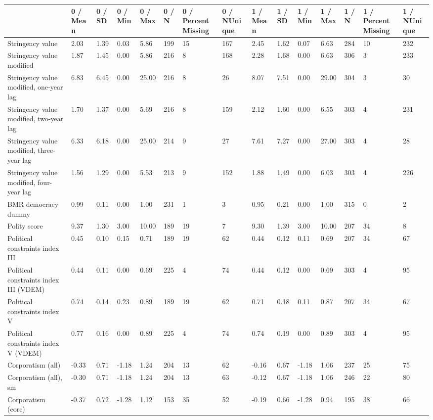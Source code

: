 
\begin{longtable}{lllllllllllllll}
\toprule
  & 0 / Mean & 0 / SD & 0 / Min & 0 / Max & 0 / N & 0 / PercentMissing & 0 / NUnique & 1 / Mean & 1 / SD & 1 / Min & 1 / Max & 1 / N & 1 / PercentMissing & 1 / NUnique\\
\midrule
Stringency value & 2.03 & 1.39 & 0.03 & 5.86 & 199 & 15 & 167 & 2.45 & 1.62 & 0.07 & 6.63 & 284 & 10 & 232\\
Stringency value modified & 1.87 & 1.45 & 0.00 & 5.86 & 216 & 8 & 168 & 2.28 & 1.68 & 0.00 & 6.63 & 306 & 3 & 233\\
Stringency value modified, one-year lag & 6.83 & 6.45 & 0.00 & 25.00 & 216 & 8 & 26 & 8.07 & 7.51 & 0.00 & 29.00 & 304 & 3 & 30\\
Stringency value modified, two-year lag & 1.70 & 1.37 & 0.00 & 5.69 & 216 & 8 & 159 & 2.12 & 1.60 & 0.00 & 6.55 & 303 & 4 & 231\\
Stringency value modified, three-year lag & 6.33 & 6.18 & 0.00 & 25.00 & 214 & 9 & 27 & 7.61 & 7.27 & 0.00 & 27.00 & 303 & 4 & 28\\
\addlinespace
Stringency value modified, four-year lag & 1.56 & 1.29 & 0.00 & 5.53 & 213 & 9 & 152 & 1.88 & 1.49 & 0.00 & 6.03 & 303 & 4 & 226\\
BMR democracy dummy & 0.99 & 0.11 & 0.00 & 1.00 & 231 & 1 & 3 & 0.95 & 0.21 & 0.00 & 1.00 & 315 & 0 & 2\\
Polity score & 9.37 & 1.30 & 3.00 & 10.00 & 189 & 19 & 7 & 9.30 & 1.39 & 3.00 & 10.00 & 207 & 34 & 8\\
Political constraints index III & 0.45 & 0.10 & 0.15 & 0.71 & 189 & 19 & 62 & 0.44 & 0.12 & 0.11 & 0.69 & 207 & 34 & 67\\
Political constraints index III (VDEM) & 0.44 & 0.11 & 0.00 & 0.69 & 225 & 4 & 74 & 0.44 & 0.12 & 0.00 & 0.69 & 303 & 4 & 95\\
\addlinespace
Political constraints index V & 0.74 & 0.14 & 0.23 & 0.89 & 189 & 19 & 62 & 0.71 & 0.18 & 0.11 & 0.87 & 207 & 34 & 67\\
Political constraints index V (VDEM) & 0.77 & 0.16 & 0.00 & 0.89 & 225 & 4 & 74 & 0.74 & 0.19 & 0.00 & 0.89 & 303 & 4 & 95\\
Corporatism (all) & -0.33 & 0.71 & -1.18 & 1.24 & 204 & 13 & 62 & -0.16 & 0.67 & -1.18 & 1.06 & 237 & 25 & 75\\
Corporatism (all), sm & -0.30 & 0.71 & -1.18 & 1.24 & 204 & 13 & 63 & -0.12 & 0.67 & -1.18 & 1.06 & 246 & 22 & 80\\
Corporatism (core) & -0.37 & 0.72 & -1.28 & 1.12 & 153 & 35 & 52 & -0.19 & 0.66 & -1.28 & 0.94 & 195 & 38 & 66\\

\end{longtable}
